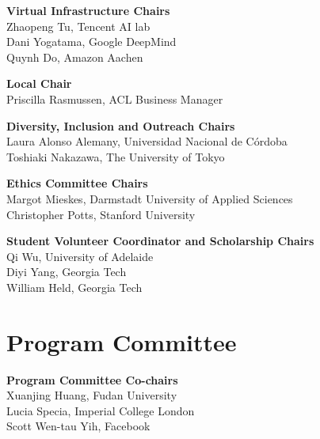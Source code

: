 {\bf Virtual Infrastructure Chairs} \\
Zhaopeng Tu, Tencent AI lab\\
Dani Yogatama, Google DeepMind \\
Quynh Do, Amazon Aachen

{\bf Local Chair} \\
Priscilla Rasmussen, ACL Business Manager

{\bf Diversity, Inclusion and Outreach Chairs} \\
Laura Alonso Alemany, Universidad Nacional de Córdoba \\
Toshiaki Nakazawa, The University of Tokyo

{\bf Ethics Committee Chairs} \\
Margot Mieskes, Darmstadt University of Applied Sciences \\
Christopher Potts, Stanford University

{\bf Student Volunteer Coordinator and Scholarship Chairs} \\
Qi Wu, University of Adelaide \\
Diyi Yang, Georgia Tech\\
William Held, Georgia Tech



\clearpage
\section{Program Committee}
\setlength{\parindent}{0pt}

\vspace*{0.5cm}

{\bf Program Committee Co-chairs} \\
Xuanjing Huang, Fudan University\\
Lucia Specia, Imperial College London\\
Scott Wen-tau Yih, Facebook

